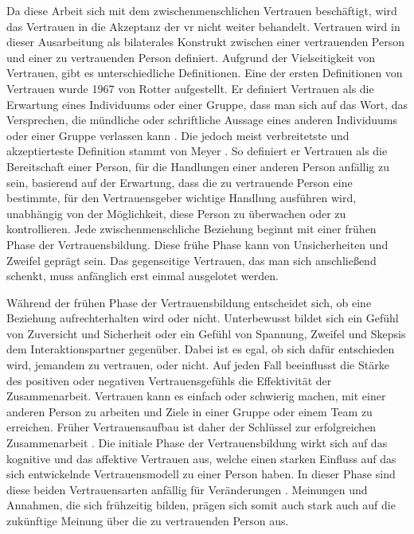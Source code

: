 \documentclass[a4paper,11pt]{article}%
\renewcommand{\\}{\vspace*{0.5\baselineskip} \newline}
\begin{document}
Da diese Arbeit sich mit dem zwischenmenschlichen Vertrauen beschäftigt, wird das Vertrauen in die Akzeptanz der \ac{vr} nicht weiter behandelt.
Vertrauen wird in dieser Ausarbeitung als bilaterales Konstrukt zwischen einer vertrauenden Person und einer zu vertrauenden Person definiert.
Aufgrund der Vielseitigkeit von Vertrauen, gibt es unterschiedliche Definitionen. \newline
Eine der ersten Definitionen von Vertrauen wurde 1967 von Rotter aufgestellt. Er definiert Vertrauen als 
\\
\dq{}die Erwartung eines Individuums oder einer Gruppe, dass man sich auf das Wort, das Versprechen, die mündliche oder schriftliche Aussage eines anderen Individuums oder einer Gruppe verlassen kann\dq{} \citep[p.651]{rotter1967new}.
\\
Die jedoch meist verbreitetste und akzeptierteste Definition stammt von Meyer \citep[p.712]{mayer1995integrative}. So definiert er Vertrauen als 
\\ 
\dq{}die Bereitschaft einer Person, für die Handlungen einer anderen Person anfällig zu sein, basierend auf der Erwartung, dass die zu vertrauende Person eine bestimmte, für den Vertrauensgeber wichtige Handlung ausführen wird, unabhängig von der Möglichkeit, diese Person zu überwachen oder zu kontrollieren.\dq{}
\\
Jede zwischenmenschliche Beziehung beginnt mit einer frühen Phase der Vertrauensbildung. Diese frühe Phase kann von Unsicherheiten und Zweifel geprägt sein. Das gegenseitige Vertrauen, das man sich anschließend schenkt, muss anfänglich erst einmal ausgelotet werden. 

Während der frühen Phase der Vertrauensbildung entscheidet sich, ob eine Beziehung aufrechterhalten wird oder nicht. Unterbewusst bildet sich ein Gefühl von Zuversicht und Sicherheit oder ein Gefühl von Spannung, Zweifel und Skepsis dem Interaktionspartner gegenüber. 
Dabei ist es egal, ob sich dafür entschieden wird, jemandem zu vertrauen, oder nicht. Auf jeden Fall beeinflusst die Stärke des positiven oder negativen Vertrauensgefühls die Effektivität der Zusammenarbeit. Vertrauen kann es einfach oder schwierig machen, mit einer anderen Person zu arbeiten und Ziele in einer Gruppe oder einem Team zu erreichen.
Früher Vertrauensaufbau ist daher der Schlüssel zur erfolgreichen Zusammenarbeit \citep[p.405-406]{bigley1998straining}.
Die initiale Phase der Vertrauensbildung wirkt sich auf das kognitive und das affektive Vertrauen aus, welche einen starken Einfluss auf das sich entwickelnde Vertrauensmodell zu einer Person haben. In dieser Phase sind diese beiden Vertrauensarten anfällig für Veränderungen \citep[p.461-462]{baldwin1992relational}.
Meinungen und Annahmen, die sich frühzeitig bilden, prägen sich somit auch stark auch auf die zukünftige Meinung über die zu vertrauenden Person aus.
\end{document}
